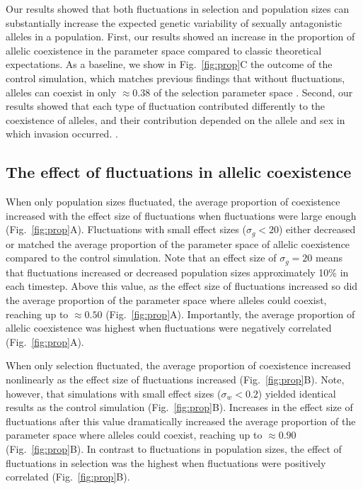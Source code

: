 
Our results showed that both fluctuations in selection and population sizes can substantially increase the expected genetic variability of sexually antagonistic alleles in a population. First, our results showed an increase in the proportion of allelic coexistence in the parameter space compared to classic theoretical expectations. As a baseline, we show in Fig.~\ref{fig:prop}C the outcome of the control simulation, which matches previous findings that without fluctuations, alleles can coexist in only $\approx 0.38$ of the selection parameter space \citep{connallon2018environmental}. Second, our results showed that each type of fluctuation contributed differently to the coexistence of alleles, and their contribution depended on the allele and sex in which invasion occurred.
.

\subsection*{The effect of fluctuations in allelic coexistence}

When only population sizes fluctuated, the average proportion of coexistence increased with the effect size of fluctuations when fluctuations were large enough (Fig.~\ref{fig:prop}A). Fluctuations with small effect sizes  ($\sigma_{g} < 20$) either decreased or matched the average proportion of the parameter space of allelic coexistence compared to the control simulation. Note that an effect size of $\sigma_{g}= 20$ means that fluctuations increased or decreased population sizes approximately 10\% in each timestep. Above this value, as the effect size of fluctuations increased so did the average proportion of the parameter space where alleles could coexist, reaching up to $\approx 0.50$ (Fig.~\ref{fig:prop}A). Importantly, the average proportion of allelic coexistence was highest when fluctuations were negatively correlated (Fig.~\ref{fig:prop}A).


When only selection fluctuated, the average proportion of coexistence increased nonlinearly as the effect size of fluctuations increased (Fig.~\ref{fig:prop}B). Note, however, that simulations with small effect sizes ($\sigma_{w} < 0.2$) yielded identical results as the control simulation (Fig.~\ref{fig:prop}B). Increases in the effect size of fluctuations after this value dramatically increased the average proportion of the parameter space where alleles could coexist, reaching up to $\approx 0.90$ (Fig.~\ref{fig:prop}B). In contrast to fluctuations in population sizes, the effect of fluctuations in selection was the highest when fluctuations were positively correlated (Fig.~\ref{fig:prop}B).

